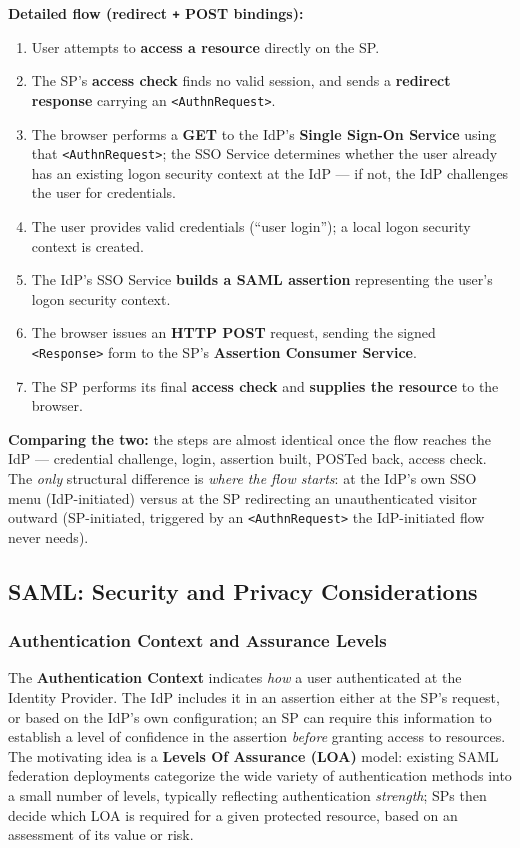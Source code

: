 \documentclass[12pt, a4paper]{article}
\begin{document}
\textbf{Detailed flow (redirect \texttt{+} POST bindings):}
\begin{enumerate}
    \item User attempts to \textbf{access a resource} directly on the SP.
    \item The SP's \textbf{access check} finds no valid session, and sends a \textbf{redirect response} carrying an \texttt{<AuthnRequest>}.
    \item The browser performs a \textbf{GET} to the IdP's \textbf{Single Sign-On Service} using that \texttt{<AuthnRequest>}; the SSO Service determines whether the user already has an existing logon security context at the IdP --- if not, the IdP challenges the user for credentials.
    \item The user provides valid credentials (``user login''); a local logon security context is created.
    \item The IdP's SSO Service \textbf{builds a SAML assertion} representing the user's logon security context.
    \item The browser issues an \textbf{HTTP POST} request, sending the signed \texttt{<Response>} form to the SP's \textbf{Assertion Consumer Service}.
    \item The SP performs its final \textbf{access check} and \textbf{supplies the resource} to the browser.
\end{enumerate}
\textcolor{blue!50!black}{\textbf{Comparing the two:}} the steps are almost identical once the flow reaches the IdP --- credential challenge, login, assertion built, POSTed back, access check. The \emph{only} structural difference is \emph{where the flow starts}: at the IdP's own SSO menu (IdP-initiated) versus at the SP redirecting an unauthenticated visitor outward (SP-initiated, triggered by an \texttt{<AuthnRequest>} the IdP-initiated flow never needs).








\subsection{SAML: Security and Privacy Considerations}

\subsubsection{Authentication Context and Assurance Levels}
The \textbf{Authentication Context} indicates \emph{how} a user authenticated at the Identity Provider. The IdP includes it in an assertion either at the SP's request, or based on the IdP's own configuration; an SP can require this information to establish a level of confidence in the assertion \emph{before} granting access to resources. The motivating idea is a \textbf{Levels Of Assurance (LOA)} model: existing SAML federation deployments categorize the wide variety of authentication methods into a small number of levels, typically reflecting authentication \emph{strength}; SPs then decide which LOA is required for a given protected resource, based on an assessment of its value or risk.
\end{document}
